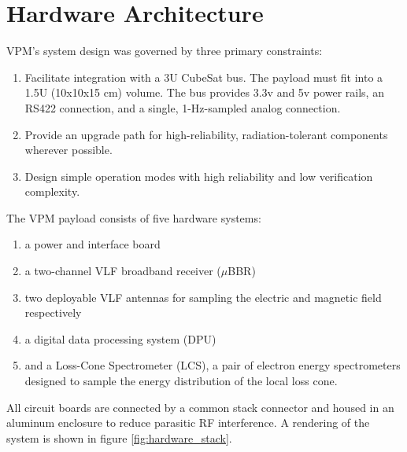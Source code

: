 \section{Hardware Architecture}
VPM's system design was governed by three primary constraints:
\begin{enumerate}
\item Facilitate integration with a 3U CubeSat bus. The payload must fit into a 1.5U (10x10x15 cm) volume. The bus provides 3.3v and 5v power rails, an RS422 connection, and a single, 1-Hz-sampled analog connection.
\item Provide an upgrade path for high-reliability, radiation-tolerant components wherever possible.
\item Design simple operation modes with high reliability and low verification complexity. 
\end{enumerate}

The VPM payload consists of five hardware systems:
\begin{enumerate}
\item a power and interface board
\item a two-channel VLF broadband receiver ($\mu$BBR)
\item two deployable VLF antennas for sampling the electric and magnetic field respectively
\item a digital data processing system (DPU)
\item and a Loss-Cone Spectrometer (LCS), a pair of electron energy spectrometers designed to sample the energy distribution of the local loss cone. 
\end{enumerate}
All circuit boards are connected by a common stack connector and housed in an aluminum enclosure to reduce parasitic RF interference. A rendering of the system is shown in figure \ref{fig:hardware_stack}.

